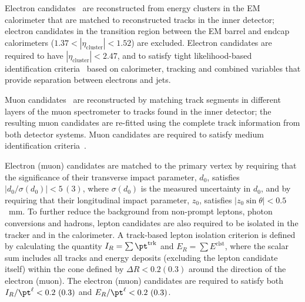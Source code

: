\documentclass[PAPER, coverpage, atlasdraft=true, texlive=2016, UKenglish]{\ATLASLATEXPATH atlasdoc}
\providecommand{\DIFadd}[1]{{\protect\color{blue}\uwave{#1}}} %
\providecommand{\DIFaddbegin}{} %
\providecommand{\DIFaddend}{} %
\begin{document}
Electron candidates~\cite{ATLAS-CONF-2016-024,Aaboud:2018ugz} are reconstructed from energy 
clusters in the EM calorimeter that are matched to reconstructed tracks in the inner detector;
electron candidates in the transition region between the EM barrel and endcap calorimeters 
($1.37 < |\eta_{\textrm{cluster}}| < 1.52$) are excluded.
Electron candidates are required to have $|\eta_{\textrm{cluster}}| < 2.47$, and to satisfy tight likelihood-based identification 
criteria~\cite{ATLAS-CONF-2016-024} based on calorimeter, tracking and combined variables that provide 
separation between electrons and jets. 

Muon candidates~\cite{Aad:2016jkr} are reconstructed by matching track segments in %
different layers of the muon spectrometer to tracks found in the inner detector;
the resulting muon candidates are re-fitted using the complete track information from both detector systems.
Muon candidates are required to satisfy medium identification criteria~\cite{Aad:2016jkr}. 

Electron (muon) candidates are matched to the primary vertex by requiring that the significance of their transverse impact parameter, $d_0$, 
satisfies $|d_0/\sigma(d_0)|<5\,(3)$, where $\sigma(d_0)$ is the measured uncertainty in $d_0$,
and by requiring that their longitudinal impact parameter, $z_0$, satisfies $|z_0 \sin\theta|<0.5$~mm.
To further reduce the background from non-prompt leptons, photon conversions and hadrons, lepton candidates are also required to be isolated 
in the tracker and in the calorimeter.
A track-based lepton isolation criterion is defined by calculating the quantity $I_R = \sum \pt^{\textrm{trk}}$ and $E_R = \sum E^{\textrm{clst}}$, where
the scalar sum includes all tracks and energy deposits (excluding the lepton candidate itself) within the cone defined by $\Delta R<0.2 (0.3)$ around the %
direction of the electron (muon). The electron (muon) candidates \DIFaddbegin \DIFadd{($\ell=e$ or $\mu$) }\DIFaddend are required to satisfy both
$I_R/\pt^\ell < 0.2~(0.3)$ and $E_R/\pt^\ell < 0.2~(0.3)$.
\end{document}
